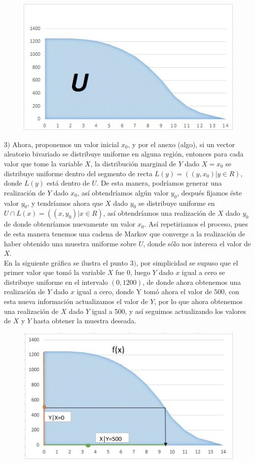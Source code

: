 \begin{figure}[h]
	\centering
	\includegraphics[width=0.7\linewidth]{Figuras/gs2}
	\caption{}
	\label{fig:gs2}
\end{figure}

\bigskip
$3)$ Ahora, proponemos un valor inicial $x_{0}$, y por el anexo (algo), si un vector aleatorio bivariado se distribuye uniforme en alguna región, entonces para cada valor que tome la variable $X$, la distribución marginal de $Y$ dado $X=x_{0}$ se distribuye uniforme dentro del segmento de recta $L(y)=((y,x_{0}) | y\in R)$, donde $L(y)$ está dentro de $U$. De esta manera, podríamos generar una realización de $Y$ dado $x_{0}$, así obtendríamos algún valor $y_{0}$, después fijamos éste valor $y_{0}$, y tendríamos ahora que $X$ dado $y_{0}$ se distribuye uniforme en $U\cap  L(x)=((x,y_{0})|x\in R)$, así obtendríamos una realización de $X$ dado $y_{0}$ de donde obtenríamos nuevamente un valor $x_{0}$. Así repetiriamos el proceso, pues de esta manera tenemos una cadena de Markov que converge a la realización de haber obtenido una muestra uniforme sobre $U$, donde sólo nos interesa el valor de $X$.\\
En la siguiente gráfica se ilustra el punto $3)$, por simplicidad se supuso que el primer valor que tomó la variable $X$ fue 0, luego $Y$ dado $x$ igual a cero se distribuye uniforme en el intervalo $(0,1200)$, de donde ahora obtenemos una realización de $Y$ dado $x$ igual a cero, donde Y tomó ahora el valor de $500$, con esta nueva información actualizamos el valor de $Y$, por lo que ahora obtenemos una realización de $X$ dado $Y$ igual a 500, y así seguimos actualizando los valores de $X$ y $Y$ hasta obtener la muestra deseada.

\begin{figure}[h]
	\centering
	\includegraphics[width=0.7\linewidth]{Figuras/gs3}
	\caption{}
	\label{fig:gs3}
\end{figure}

